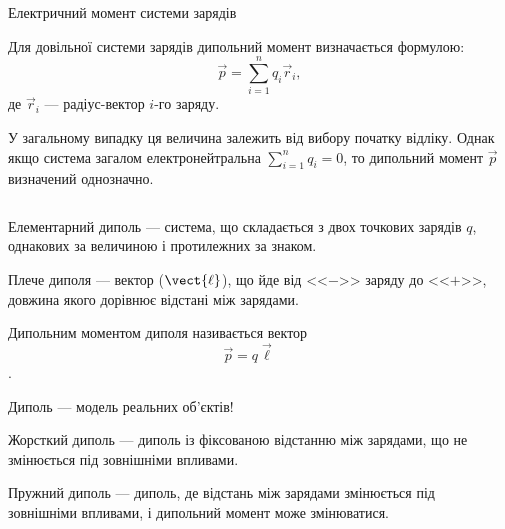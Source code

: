 \documentclass{beamer}
\begin{document}
\begin{frame}{Електричний момент системи зарядів}{}
	\begin{block}{}\justifying\small
		Для довільної системи зарядів дипольний момент визначається формулою:
		\begin{equation*}
			\vec{p} = \sum_{i=1}^{n}q_i\vec{r}_i,
		\end{equation*}
		де $\vec{r}_i$ --- радіус-вектор $i$-го заряду.

	\end{block}

	\begin{block}{}\justifying\scriptsize
		У загальному випадку ця
		величина залежить від вибору початку відліку. Однак якщо система
		загалом електронейтральна $\sum_{i=1}^{n} q_i = 0$, то
		дипольний момент $\vec{p}$ визначений однозначно.
	\end{block}

	\begin{columns}
		\begin{column}{0.7\linewidth}
			\begin{overprint}
				\begin{block}{}\justifying\footnotesize
					\alert{Елементарний диполь} --- система, що складається з
					двох точкових зарядів $q$, однакових за величиною і
					протилежних за знаком.

					\medskip

					\alert{Плече диполя} --- вектор ($\vect{\ell}$), що йде від <<$-$>> заряду до
					<<$+$>>, довжина якого дорівнює відстані між зарядами.

					\medskip

					\alert{Дипольним моментом} диполя називається вектор
					\begin{equation*}
						\vec{p} = q\vec{\ell}
					\end{equation*}.
				\end{block}
				\begin{alertblock}{}\centering
					Диполь --- модель реальних об'єктів!
				\end{alertblock}

				\begin{block}{}\justifying\footnotesize
					\alert{Жорсткий диполь} --- диполь із фіксованою відстанню між зарядами, що не
					змінюється під зовнішніми впливами.

					\medskip

					\alert{Пружний диполь} --- диполь, де відстань між зарядами змінюється під зовнішніми
					впливами, і дипольний момент може змінюватися.
				\end{block}
			\end{overprint}
		\end{column}
		\begin{column}{0.3\linewidth}\centering
			
		\end{column}
	\end{columns}
\end{frame}
\end{document}
